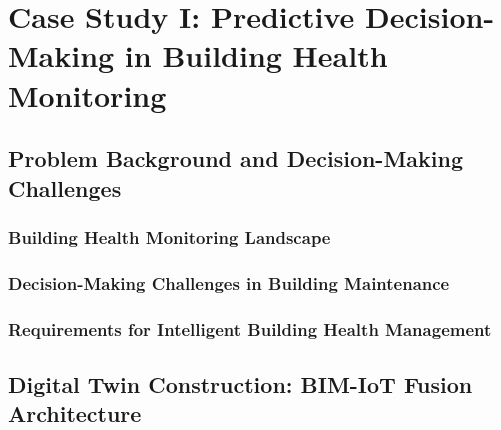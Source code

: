 
\chapter{Case Study I: Predictive Decision-Making in Building Health Monitoring} \label{chp:building}


\section{Problem Background and Decision-Making Challenges}

\subsection{Building Health Monitoring Landscape}

\subsection{Decision-Making Challenges in Building Maintenance}

\subsection{Requirements for Intelligent Building Health Management}

\section{Digital Twin Construction: BIM-IoT Fusion Architecture}

